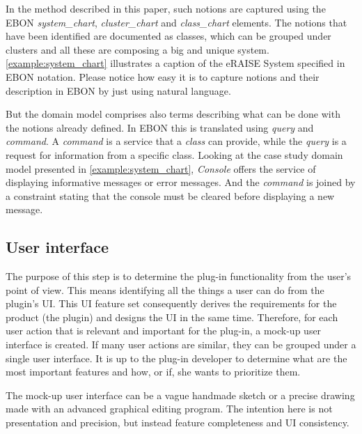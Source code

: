 \documentclass[conference]{IEEEtran}
\newcommand{\note}[1]{\todo[inline,color=red!40]{#1}}
\begin{document}
\note{Reference required for SML -mvf}



In the method described in this paper, such notions are captured using
the EBON \emph{system\_chart}, \emph{cluster\_chart} and
\emph{class\_chart} elements. The notions that have been identified
are documented as classes, which can be grouped under clusters and all
these are composing a big and unique system.
\autoref{example:system_chart} illustrates a caption of the eRAISE
System specified in EBON notation. Please notice how easy it is to
capture notions and their description in EBON by just using natural
language.

But the domain model comprises also terms describing what can be
done with the notions already defined. In EBON this is
translated using \emph{query} and \emph{command}. A
\emph{command} is a service that a \emph{class} can provide,
while the \emph{query} is a request for information from a
specific class. Looking at the case study domain model presented
in \autoref{example:system_chart}, \emph{Console} offers the
service of displaying informative messages or error messages.
And the \emph{command} is joined by a constraint stating that
the console must be cleared before displaying a new message.

%
\subsection{User interface}
\label{sec:user-interface}

The purpose of this step is to determine the plug-in functionality
from the user's point of view. This means identifying all the things a
user can do from the plugin's UI. This UI feature set consequently
derives the requirements for the product (the plugin) and designs the
UI in the same time. Therefore, for each user action that is relevant
and important for the plug-in, a mock-up user interface is created. If
many user actions are similar, they can be grouped under a single user
interface. It is up to the plug-in developer to determine what are the
most important features and how, or if, she wants to prioritize them.

The mock-up user interface can be a vague handmade sketch or a
precise drawing made with an advanced graphical editing program.  The
intention here is not presentation and precision, but instead feature
completeness and UI consistency.
\end{document}
